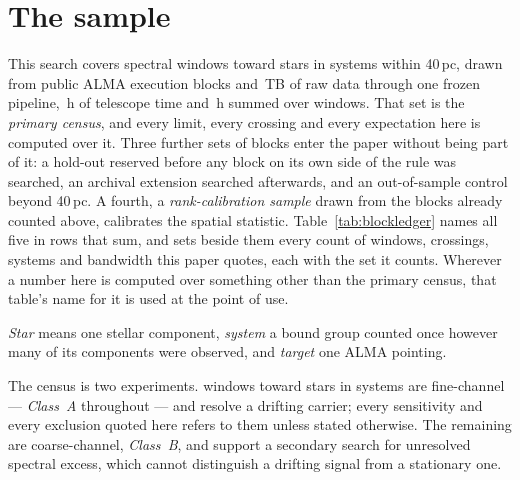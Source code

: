 \section{The sample}
\label{sec:sample}

This search covers \NWindows{} spectral windows toward \NStars{}
stars in \NSystems{} systems within 40\,pc, drawn from \NEB{}
public ALMA execution blocks and \TotalDataTB\,TB of raw data through one
frozen pipeline, \StTelHours\,h of telescope time and \LdgCensusHours\,h
summed over windows. That set is the \emph{primary census}, and every limit,
every crossing and every expectation here is computed over it. Three further
sets of blocks enter the paper without being part of it: a hold-out reserved
before any block on its own side of the rule was searched, an archival
extension searched afterwards, and an out-of-sample control beyond 40\,pc. A
fourth, a \emph{rank-calibration sample} drawn from the blocks already counted
above, calibrates the spatial statistic.
Table~\ref{tab:blockledger} names all five in rows that sum, and sets beside
them every count of windows, crossings, systems and bandwidth this paper
quotes, each with the set it counts. Wherever a number here is computed over
something other than the primary census, that table's name for it is used at
the point of use.

\emph{Star} means one stellar component, \emph{system} a bound group
counted once however many of its components were observed, and \emph{target}
one ALMA pointing.

The census is two experiments. \NWinA{} windows toward
\LdgClassAStars{} stars in \NSysClassA{} systems are fine-channel ---
\emph{Class~A} throughout --- and resolve a drifting carrier; every
sensitivity and every exclusion quoted here refers to them unless stated
otherwise. The remaining \NWinB{} are coarse-channel, \emph{Class~B}, and
support a secondary search for unresolved spectral excess, which cannot
distinguish a drifting signal from a stationary one.

